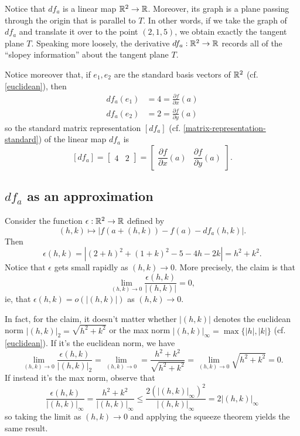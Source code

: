 Notice that $df_a$ is a linear map $\mathbb{R}^2 \to \mathbb{R}$. Moreover, its graph is a plane passing through the origin that is parallel to $T$. In other words, if we take the graph of $df_a$ and translate it over to the point $(2,1,5)$, we obtain exactly the tangent plane $T$. Speaking more loosely, the derivative $df_a : \mathbb{R}^2 \to \mathbb{R}$ records all of the ``slopey information'' about the tangent plane $T$. 

Notice moreover that, if $e_1, e_2$ are the standard basis vectors of $\mathbb{R}^2$ (cf. \cref{euclidean}), then
\[ \begin{aligned} df_a(e_1) &= 4 = \frac{\partial f}{\partial x}(a) \\
df_a(e_2) &= 2 = \frac{\partial f}{\partial y}(a) \end{aligned} \]
so the standard matrix representation $[df_a]$ (cf. \cref{matrix-representation-standard}) of the linear map $df_a$ is \begin{equation} \label{jacobian-matrix-example} [df_a] = \begin{bmatrix} 4 & 2 \end{bmatrix} = \begin{bmatrix} \dfrac{\partial f}{\partial x}(a) & \dfrac{\partial f}{\partial y}(a) \end{bmatrix}. \end{equation}

\subsection*{\texorpdfstring{$df_a$}{dfa} as an approximation}

Consider the function $\epsilon : \mathbb{R}^2 \to \mathbb{R}$ defined by
\[ (h,k) \mapsto |f(a+(h,k))-f(a)-df_a(h,k)|.  \]
Then
\[ \epsilon(h,k) = |(2+h)^2 + (1+k)^2 - 5 - 4h - 2k| = h^2 + k^2. \]
Notice that $\epsilon$ gets small rapidly as $(h,k) \to 0$. More precisely, the claim is that
\[ \lim_{(h,k) \to 0} \frac{\epsilon(h,k)}{|(h,k)|} = 0, \]
ie, that $\epsilon(h,k) = o(|(h,k)|)$ as $(h,k) \to 0$. 

In fact, for the claim, it doesn't matter whether $|(h,k)|$ denotes the euclidean norm $|(h,k)|_2 = \sqrt{h^2 + k^2}$ or the max norm $|(h,k)|_\infty = \max\{|h|, |k|\}$ (cf. \cref{euclidean}). If it's the euclidean norm, we have
\[ \lim_{(h,k) \to 0} \frac{\epsilon(h,k)}{|(h,k)|_2} = \lim_{(h,k) \to 0} = \frac{h^2 + k^2}{\sqrt{h^2 + k^2}} = \lim_{(h,k) \to 0} \sqrt{h^2 + k^2} = 0. \]
If instead it's the max norm, observe that
\[ \frac{\epsilon(h,k)}{|(h,k)|_\infty} = \frac{h^2 + k^2}{|(h,k)|_\infty} \leq \frac{2(|(h,k)|_\infty)^2}{|(h,k)|_\infty} = 2|(h,k)|_\infty \]
so taking the limit as $(h,k) \to 0$ and applying the squeeze theorem yields the same result. 

